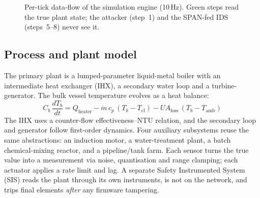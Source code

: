 \documentclass[11pt,a4paper]{article}
\begin{document}
\begin{figure}[t]
\centering
{}
\caption{Per-tick data-flow of the simulation engine (10\,Hz). Green steps read the true plant state; the attacker (step~1) and the SPAN-fed IDS (steps~5--8) never see it.}
\label{fig:flow}
\end{figure}

\subsection{Process and plant model}
The primary plant is a lumped-parameter liquid-metal boiler with an intermediate heat exchanger (IHX), a secondary water loop and a turbine-generator. The bulk vessel temperature evolves as a heat balance:
\begin{equation}
C_b\,\frac{dT_b}{dt}=Q_{\text{heater}}-\dot{m}\,c_p\,(T_b-T_{\text{cl}})-UA_{\text{loss}}\,(T_b-T_{\text{amb}})
\end{equation}
The IHX uses a counter-flow effectiveness--NTU relation, and the secondary loop and generator follow first-order dynamics. Four auxiliary subsystems reuse the same abstractions: an induction motor, a water-treatment plant, a batch chemical-mixing reactor, and a pipeline/tank farm. Each sensor turns the true value into a measurement via noise, quantisation and range clamping; each actuator applies a rate limit and lag. A separate Safety Instrumented System (SIS) reads the plant through its own instruments, is not on the network, and trips final elements \emph{after} any firmware tampering.
\end{document}
